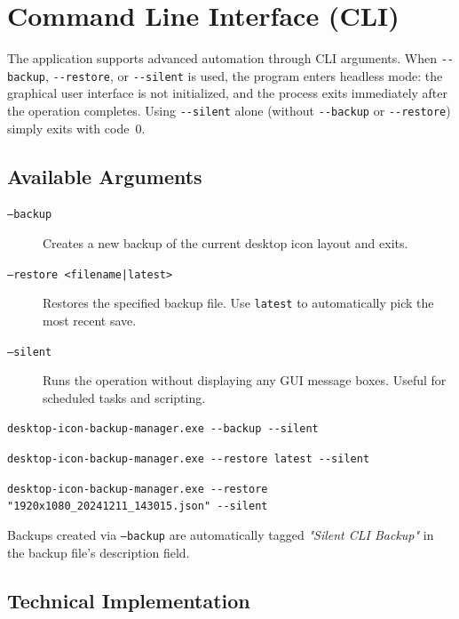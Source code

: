 \documentclass[a4paper,11pt]{article}
\begin{document}
\section{Command Line Interface (CLI)}

The application supports advanced automation through CLI arguments.
When \texttt{-{}-backup}, \texttt{-{}-restore}, or
\texttt{-{}-silent} is used, the program enters headless mode: the
graphical user interface is not initialized, and the process exits
immediately after the operation completes.
Using \texttt{-{}-silent} alone (without \texttt{-{}-backup} or
\texttt{-{}-restore}) simply exits with code~0.

\subsection{Available Arguments}

\begin{description}
  \item[\texttt{--backup}] Creates a new backup of the current
    desktop icon layout and exits.
  \item[\texttt{--restore <filename|latest>}] Restores the specified
    backup file. Use \texttt{latest} to automatically pick the most recent save.
  \item[\texttt{--silent}] Runs the operation without displaying any GUI
    message boxes. Useful for scheduled tasks and scripting.
\end{description}

\begin{infobox}
  \begin{flushleft}
    \texttt{desktop-icon-backup-manager.exe -{}-backup -{}-silent}

    \texttt{desktop-icon-backup-manager.exe -{}-restore latest -{}-silent}

    \texttt{desktop-icon-backup-manager.exe -{}-restore
    "1920x1080\_20241211\_143015.json" -{}-silent}
  \end{flushleft}
\end{infobox}

\begin{infobox}
  Backups created via \texttt{--backup} are automatically tagged
  \textit{"Silent CLI Backup"} in the backup file's description field.
\end{infobox}

\subsection{Technical Implementation}
\end{document}
